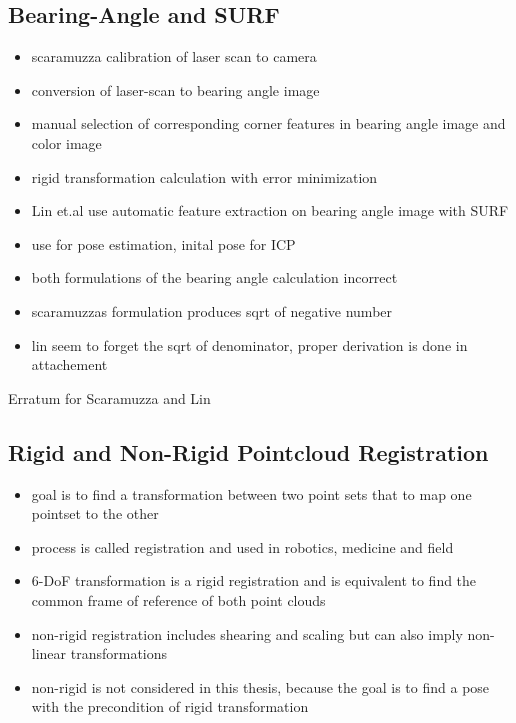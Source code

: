 \subsection{Bearing-Angle and SURF}

\begin{itemize}
    \item scaramuzza calibration of laser scan to camera
    \item conversion of laser-scan to bearing angle image
    \item manual selection of corresponding corner features in bearing angle image and color image
    \item rigid transformation calculation with error minimization

    \item Lin et.al use automatic feature extraction on bearing angle image with SURF
    \item use for pose estimation, inital pose for ICP

    \item both formulations of the bearing angle calculation incorrect
    \item scaramuzzas formulation produces sqrt of negative number
    \item lin seem to forget the sqrt of denominator, proper derivation is done in attachement
\end{itemize}
Erratum for Scaramuzza and Lin

\subsection{Rigid and Non-Rigid Pointcloud Registration}

\begin{itemize}
    \item goal is to find a transformation between two point sets that to map one pointset to the other
    \item process is called registration and used in robotics, medicine and field
    \item 6-DoF transformation is a rigid registration and is equivalent to find the common frame of reference of both point clouds
    \item non-rigid registration includes shearing and scaling but can also imply non-linear transformations
    \item non-rigid is not considered in this thesis, because the goal is to find a pose with the precondition of rigid transformation
\end{itemize}


